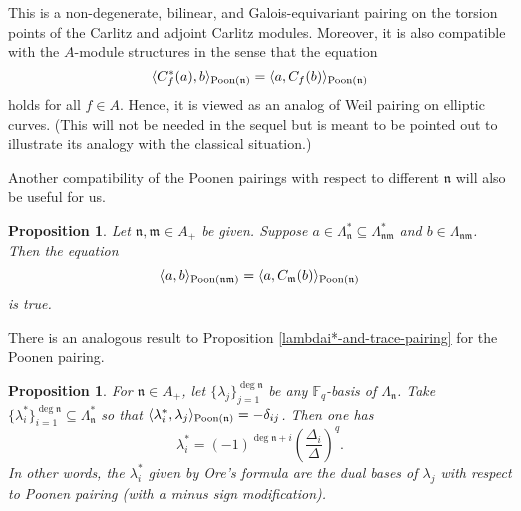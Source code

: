 \documentclass[11pt]{amsart}
\theoremstyle{plain}
\newtheorem{prop}[thm]{Proposition}
\theoremstyle{definition}
\theoremstyle{remark}
\numberwithin{equation}{section}
\newcommand{\FF}{\mathbb{F}}
\newcommand{\mfk}{\mathfrak{m}}
\newcommand{\nfk}{\mathfrak{n}}
\newcommand{\sbe}{\subseteq}
\newcommand{\ang}[1]{\langle #1 \rangle}
\newcommand{\Fq}{\FF_q}
\begin{document}
	This is a non-degenerate, bilinear, and Galois-equivariant pairing on the torsion points of the Carlitz and adjoint Carlitz modules.
	Moreover, it is also compatible with the $A$-module structures in the sense that the equation
	$$
	\ang{C_f^*(a),b}_{\textnormal{Poon}(\nfk)} = \ang{a,C_f(b)}_{\textnormal{Poon}(\nfk)}
	$$
	holds for all $f\in A$.
	Hence, it is viewed as an analog of Weil pairing on elliptic curves.
	(This will not be needed in the sequel but is meant to be pointed out to illustrate its analogy with the classical situation.)
	
	Another compatibility of the Poonen pairings with respect to different $\nfk$ will also be useful for us.
	
	\begin{prop}    \label{compatibility-of-poonen-pairing-with-respect-to-different-nfk}
		Let $\nfk,\mfk \in A_+$ be given.
		Suppose $a\in \Lambda_{\nfk}^* \sbe \Lambda_{\nfk\mfk}^*$ and $b \in \Lambda_{\nfk\mfk}$. Then the equation
		$$
		\ang{a,b}_{\textnormal{Poon}(\nfk\mfk)} = \ang{a,C_\mfk(b)}_{\textnormal{Poon}(\nfk)}
		$$
		is true.
	\end{prop}
	
	There is an analogous result to Proposition \ref{lambdai*-and-trace-pairing} for the Poonen pairing.
	
	\begin{prop}     \label{lambdai*-and-poonen-pairing}
		For $\nfk \in A_+$, let $\{\lambda_j\}_{j=1}^{\deg\nfk}$ be any $\Fq$-basis of $\Lambda_\nfk$.
		Take $\{\lambda_i^*\}_{i=1}^{\deg\nfk} \sbe \Lambda_\nfk^*$ so that $\ang{\lambda_i^*, \lambda_j}_{\textnormal{Poon}(\nfk)} = - \delta_{ij}$.
		Then one has
		$$
		\lambda_i^* = (-1)^{\deg\nfk+i} \left(\frac{\Delta_i}{\Delta}\right)^q.
		$$
		In other words, the $\lambda_i^*$ given by Ore's formula are the dual bases of $\lambda_j$ with respect to Poonen pairing (with a minus sign modification).
	\end{prop}
	
\end{document}
